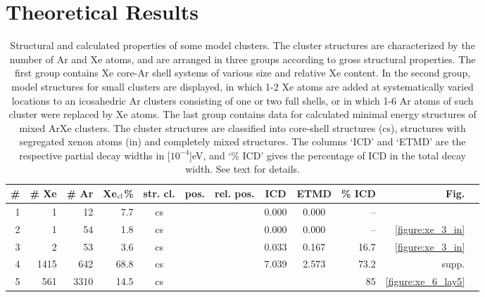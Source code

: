 \documentclass[journal=jpccck,manuscript=article]{achemso}
\begin{document}
\section{Theoretical Results
\label{sec:th_results}}
%
%
\begin{table}[H]
\small
\centering
\caption{Structural and calculated properties of some model clusters.
The cluster structures are characterized by the number of Ar and Xe atoms,
and are arranged in three groups according to gross structural properties. 
The first group contains Xe core-Ar shell systems of various
size and relative Xe content.
In the second group, model structures for small clusters are displayed,
in which 1-2 Xe atoms are added at systematically varied locations
to an icosahedric Ar clusters consisting of one or two full shells,
or in which 1-6 Ar atoms of such cluster were replaced by Xe atoms.
The last group contains data for calculated minimal energy structures
of mixed ArXe clusters.\protect\cite{marques}
The cluster structures are classified into core-shell structures (cs),
structures with segregated xenon atoms (in) and completely mixed
structures.
The columns `ICD' and `ETMD' are the respective partial decay widths
in \unit[$10^{-4}$]{eV}, and `\% ICD' gives the percentage of ICD in
the total decay width.
See text for details.
\label{table:theo_gammas}
}
\begin{tabular}{rrrrcccccrrr}
\toprule
\# & \# Xe & \# Ar & Xe$_{\rm cl}$\% & str. cl. & pos. & rel. pos. & ICD   &  ETMD & \% ICD & Fig.\\ %
\midrule
 1 &     1 &    12 &  7.7  & cs    &         &          & 0.000 & 0.000 &  -- &\\ %
 2 &     1 &    54 &  1.8  & cs    &         &          & 0.000 & 0.000 &  -- & \ref{figure:xe_3_in}\\ %
 3 &     2 &    53 &  3.6  & cs    &         &          & 0.033 & 0.167 &  16.7& \ref{figure:xe_3_in}\\ %
 4 &  1415 &   642 & 68.8  & cs    &         &          & 7.039 & 2.573 &  73.2& supp.\\ %
 5 &   561 &  3310 & 14.5  & cs    &         &          &       &       &  85  & \ref{figure:xe_6_lay5}\\ %
 

\end{tabular}
\end{table}
\end{document}
